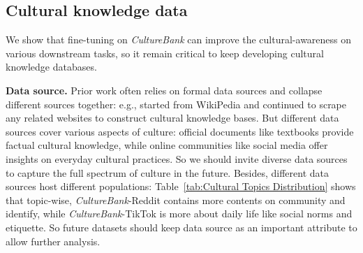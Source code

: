 \documentclass{article} %
\newcommand{\dataname}{\textit{CultureBank}\xspace}
\begin{document}

\subsection{Cultural knowledge data}
We show that fine-tuning on \dataname can improve the cultural-awareness on various downstream tasks, so it remain critical to keep developing cultural knowledge databases. 

\noindent\textbf{Data source.} Prior work often relies on formal data sources and collapse different sources together: e.g., \cite{fung2024massively} started from WikiPedia and continued to scrape any related websites to construct cultural knowledge bases. 
But different data sources %
cover various aspects of culture: official documents like textbooks provide factual cultural knowledge, while online communities like social media offer insights on everyday cultural practices. So we should invite diverse data sources to capture the full spectrum of culture in the future. Besides, different data sources host different populations: Table~\ref{tab:Cultural Topics Distribution} shows that topic-wise, \dataname-Reddit contains more contents on community and identify, while \dataname-TikTok is more about daily life like social norms and etiquette. So future datasets should keep data source as an important attribute to allow further analysis. %
\end{document}
